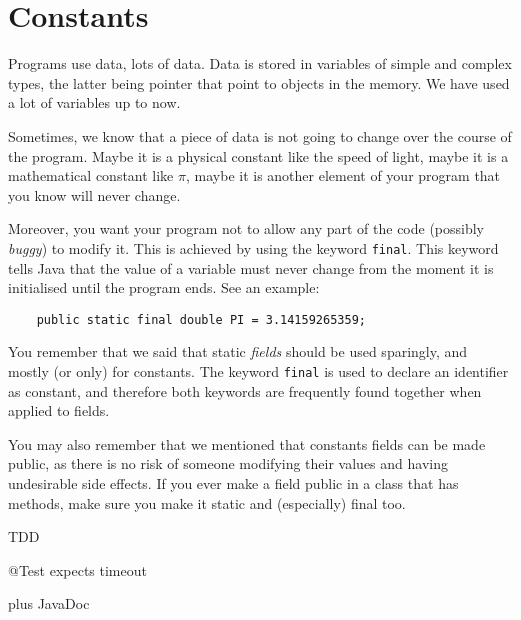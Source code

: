 
\section{Constants}
\label{sec:constants}

Programs use data, lots of data. Data is stored in variables of simple
and complex types, the latter being pointer that point to objects in
the memory. We have used a lot of variables up to now. 

Sometimes, we know that a piece of data is not going to change over
the course of the program. Maybe it is a physical constant like the
speed of light, maybe it is a mathematical constant like $\pi$, maybe
it is another element of your program that you know will never
change. 

Moreover, you want your program not to allow any part
of the code (possibly \emph{buggy}) to modify it. This is achieved by
using the keyword \verb+final+. This keyword tells Java that the value
of a variable must never change from the moment it is initialised
until the program ends. See an example: 

\begin{verbatim}
    public static final double PI = 3.14159265359; 
\end{verbatim}

You remember that we said that static \emph{fields} should be used
sparingly, and mostly (or only) for constants. The keyword
\verb+final+ is used to declare an identifier as constant, and
therefore both keywords are frequently found together when applied to
fields. 

You may also remember that we mentioned that constants fields can be
made public, as there is no risk of someone modifying their values and
having undesirable side effects. If you ever make a field public in a
class that has methods, make sure you make it static and (especially)
final too.



TDD

@Test
   expects
   timeout



plus JavaDoc